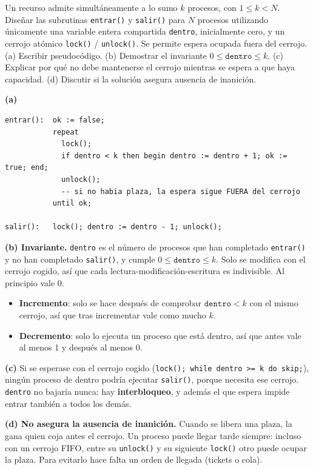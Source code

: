 \begin{ejercicio}
Un recurso admite simultáneamente a lo sumo $k$ procesos, con $1 \le k < N$. Diseñar las subrutinas
\texttt{entrar()} y \texttt{salir()} para $N$ procesos utilizando únicamente una variable entera compartida
\texttt{dentro}, inicialmente cero, y un cerrojo atómico \texttt{lock()} / \texttt{unlock()}. Se permite espera
ocupada fuera del cerrojo. (a) Escribir pseudocódigo. (b) Demostrar el invariante $0 \le \texttt{dentro} \le k$.
(c) Explicar por qué no debe mantenerse el cerrojo mientras se espera a que haya capacidad. (d) Discutir si la
solución asegura ausencia de inanición.
\end{ejercicio}
\begin{solucion}
\textbf{(a)}
\begin{lstlisting}
entrar():  ok := false;
           repeat
             lock();
             if dentro < k then begin dentro := dentro + 1; ok := true; end;
             unlock();
             -- si no habia plaza, la espera sigue FUERA del cerrojo
           until ok;

salir():   lock(); dentro := dentro - 1; unlock();
\end{lstlisting}
\textbf{(b) Invariante.} \texttt{dentro} es el número de procesos que han completado \texttt{entrar()} y no han
completado \texttt{salir()}, y cumple $0 \le \texttt{dentro} \le k$. Solo se modifica con el cerrojo cogido, así
que cada lectura-modificación-escritura es indivisible. Al principio vale $0$.
\begin{itemize}[leftmargin=*,noitemsep]
  \item \textbf{Incremento}: solo se hace después de comprobar $\texttt{dentro} < k$ con el mismo cerrojo, así que
        tras incrementar vale como mucho $k$.
  \item \textbf{Decremento}: solo lo ejecuta un proceso que está dentro, así que antes vale al menos 1 y después
        al menos 0.
\end{itemize}

\textbf{(c)} Si se esperase con el cerrojo cogido (\texttt{lock(); while dentro >= k do skip;}), ningún proceso de
dentro podría ejecutar \texttt{salir()}, porque necesita ese cerrojo. \texttt{dentro} no bajaría nunca: hay
\textbf{interbloqueo}, y además el que espera impide entrar también a todos los demás.

\textbf{(d) No asegura la ausencia de inanición.} Cuando se libera una plaza, la gana quien coja antes el
cerrojo. Un proceso puede llegar tarde siempre: incluso con un cerrojo FIFO, entre su \texttt{unlock()} y su
siguiente \texttt{lock()} otro puede ocupar la plaza. Para evitarlo hace falta un orden de llegada (tickets o
cola).
\end{solucion}

